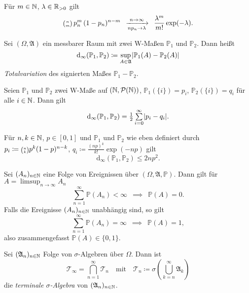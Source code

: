 \documentclass{cheat-sheet}
\newcommand{\Alg}{\mathfrak{A}} %
\renewcommand{\P}{\mathbb{P}} %
\let\myBinom\binom
\renewcommand{\binom}[2]{\mathsmaller{\myBinom{#1}{#2}}}
\begin{document}

\begin{satz}
  Für $m \in \mathbb{N}$, $\lambda \in \mathbb{R}_{>0}$ gilt
  \[ \binom{n}{m} \, p_n^m \, (1-p_n)^{n-m} \enspace \xrightarrow[n p_n \to \lambda]{n \to \infty} \enspace \frac{\lambda^m}{m!} \exp(-\lambda). \]
\end{satz}



\begin{defn}
  Sei $(\Omega, \Alg)$ ein messbarer Raum mit zwei W-Maßen $\P_1$ und $\P_2$. Dann heißt
  \[ \mathrm{d}_\infty(\P_1, \P_2) \coloneqq \sup_{A \in \Alg} \abs{\P_1(A) - \P_2(A)} \]
  \emph{Totalvariation} des signierten Maßes $\P_1 - \P_2$.
\end{defn}

\begin{satz}
  Seien $\P_1$ und $\P_2$ zwei W-Maße auf $(\mathbb{N}, \mathcal{P}(\mathbb{N}))$, $\P_1(\{ i \}) = p_i$, $\P_2(\{ i \}) = q_i$ für alle $i \in \mathbb{N}$. Dann gilt
  \[ \mathrm{d}_\infty(\P_1, \P_2) = \tfrac{1}{2} \sum_{i=0}^\infty \abs{p_i - q_i}. \]
\end{satz}

\begin{lem}
  Für $n, k \in \mathbb{N}$, $p \in \left[0,1\right]$ und $\P_1$ und $\P_2$ wie eben definiert durch $p_i \coloneqq \binom{n}{k} p^k (1-p)^{n-k}$, $q_i \coloneqq \tfrac{(np)^k}{k!} \exp(-np)$ gilt
  \[ \mathrm{d}_\infty(\P_1, \P_2) \leq 2 n p^2. \]
\end{lem}


\begin{lem}
  Sei $(A_n)_{n \in \mathbb{N}}$ eine Folge von Ereignissen über $(\Omega, \Alg, \P)$. Dann gilt für $A = \limsup_{n \to \infty} A_n$
  \[ \sum_{n=1}^\infty \P(A_n) < \infty \enspace \implies \enspace \P(A) = 0. \]
  Falls die Ereignisse $(A_n)_{n \in \mathbb{N}}$ unabhängig sind, so gilt
  \[ \sum_{n=1}^\infty \P(A_n) = \infty \enspace \implies \enspace \P(A) = 1, \]
  also zusammengefasst $\P(A) \in \{ 0, 1 \}$.
\end{lem}

\begin{defn}
  Sei $(\Alg_n)_{n \in \N}$ Folge von $\sigma$-Algebren über $\Omega$. Dann ist
  \[ \mathcal{T}_\infty = \bigcap_{n=1}^\infty \mathcal{T}_n \quad \text{mit} \quad \mathcal{T}_n \coloneqq \sigma \left( \bigcup_{k=n}^\infty \Alg_k \right) \]
  die \emph{terminale $\sigma$-Algebra} von $(\Alg_n)_{n \in \N}$.
\end{defn}
\end{document}
